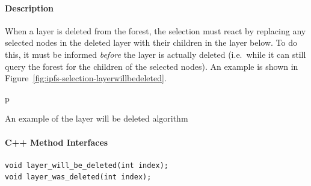 \paragraph{Description}

When a layer is deleted from the forest, the selection must react by replacing any selected nodes in the deleted layer with their children in the layer below. To do this, it must be informed \emph{before} the layer is actually deleted (i.e.~while it can still query the forest for the children of the selected nodes). An example is shown in Figure~\ref{fig:ipfs-selection-layerwillbedeleted}.

\begin{stusubfig}{p}
	\hspace{4mm}%
\caption{An example of the layer will be deleted algorithm}
\label{fig:ipfs-selection-layerwillbedeleted}
\end{stusubfig}

\paragraph{C++ Method Interfaces}

\begin{lstlisting}[style=Prototype]
void layer_will_be_deleted(int index);
void layer_was_deleted(int index);
\end{lstlisting}


